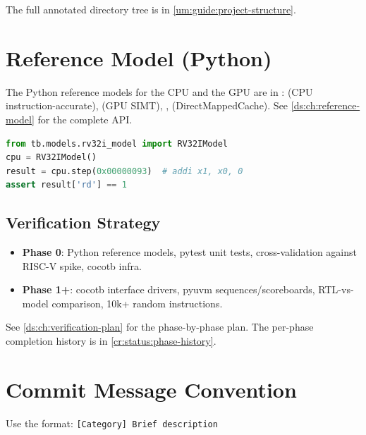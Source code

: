 The full annotated directory tree is in \cref{um:guide:project-structure}.


\chapter{Reference Model (Python)}\label{um:guide:reference-model-and-verification}

The Python reference models for the CPU and the GPU are in :
 (CPU instruction-accurate),
 (GPU SIMT), ,
 (DirectMappedCache).
See \cref{ds:ch:reference-model} for the complete API.

\begin{lstlisting}[language=Python]
from tb.models.rv32i_model import RV32IModel
cpu = RV32IModel()
result = cpu.step(0x00000093)  # addi x1, x0, 0
assert result['rd'] == 1
\end{lstlisting}

\section{Verification Strategy}\label{um:guide:reference-model-and-verification:verification-strategy}

\begin{itemize}
\tightlist
\item
  \textbf{Phase 0}: Python reference models, pytest unit tests,
  cross-validation against RISC-V spike, cocotb infra.
\item
  \textbf{Phase 1+}: cocotb interface drivers, pyuvm
  sequences/\allowbreak{}scoreboards, RTL-vs-model comparison, 10k+
  random instructions.
\end{itemize}

See \cref{ds:ch:verification-plan} for the phase-by-phase plan.
The per-phase completion history is in \cref{cr:status:phase-history}.


\chapter{Commit Message Convention}\label{um:guide:commit-and-coding-rules}

Use the format: \texttt{[Category]\ Brief\ description}


